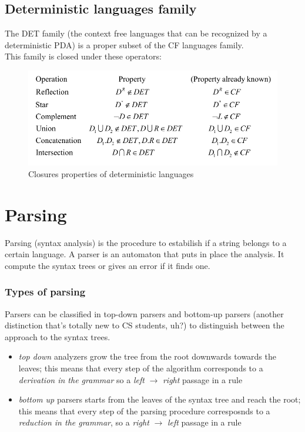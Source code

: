 		\subsection{Deterministic languages family}
			The DET family (the context free languages that can be recognized by a deterministic PDA) is a proper subset of the CF languages family.\\
			This family is closed under these operators:
			\begin{figure}[htp]
				\begin{center}
					\includegraphics[width = \textwidth]{./images/detClosures.png}
					\caption{Closures properties of deterministic languages}
				\end{center}
			\end{figure}
	
	\section{Parsing}
		Parsing (syntax analysis) is the procedure to estabilish if a string belongs to a certain language. A parser is an automaton that puts in place the analysis. It compute the syntax trees or gives an error if it finds one.
		
		\subsubsection{Types of parsing}
			Parsers can be classified in top-down parsers and bottom-up parsers (another distinction that's totally new to CS students, uh?) to distinguish between the approach to the syntax trees.
			\begin{itemize}
				\item \emph{top down} analyzers grow the tree from the root downwards towards the leaves; this means that every step of the algorithm corresponds to a \emph{derivation in the grammar} so a \emph{left} $\rightarrow$ \emph{right} passage in a rule
				\item \emph{bottom up} parsers starts from the leaves of the syntax tree and reach the root; this means that every step of the parsing procedure corresposnds to a \emph{reduction in the grammar}, so a \emph{right} $\rightarrow$ \emph{left} passage in a rule
			\end{itemize}
		
